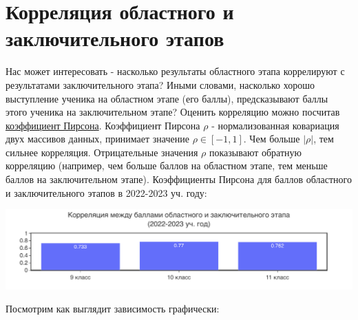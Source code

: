 \newpage
\section{Корреляция областного и заключительного этапов}
Нас может интересовать - насколько результаты областного этапа коррелируют с результатами заключительного этапа? Иными словами, насколько хорошо выступление ученика на областном этапе (его баллы), предсказывают баллы этого ученика на заключительном этапе? Оценить корреляцию можно посчитав \href{https://en.wikipedia.org/wiki/Pearson_correlation_coefficient}{коэффициент Пирсона}. Коэффициент Пирсона $\rho$ - нормализованная ковариация двух массивов данных, принимает значение $\rho \in [-1, 1]$. Чем больше $|\rho|$, тем сильнее корреляция. Отрицательные значения $\rho$ показывают обратную корреляцию (например, чем больше баллов на областном этапе, тем меньше баллов на заключительном этапе). Коэффициенты Пирсона для баллов областного и заключительного этапов в 2022-2023 уч. году:

\includegraphics[width=\linewidth]{../export/pdf/trajectory/bygrade.pdf}

Посмотрим как выглядит зависимость графически:

